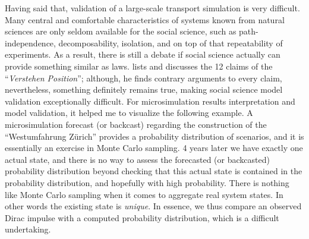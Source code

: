 Having said that, validation of a large-scale transport simulation is very difficult. Many central and comfortable characteristics of systems known from natural sciences are only seldom available for the social science, such as path-independence, decomposability, isolation, and on top of that repeatability of experiments. As a result, there is still a debate if social science actually can provide something similar as laws. \citet[][p.107ff]{Abel_1976} lists and discusses the 12 claims of the ``\emph{Verstehen Position}''; although, he finds contrary arguments to every claim, nevertheless, something definitely remains true, making social science model validation exceptionally difficult. For microsimulation results interpretation and model validation, it helped me to visualize the following example. A microsimulation forecast (or backcast) regarding the construction of the ``Westumfahrung Zürich'' provides a probability distribution of scenarios, and it is essentially an exercise in Monte Carlo sampling. 4 years later we have exactly one actual state, and there is no way to assess the forecasted (or backcasted) probability distribution beyond checking that this actual state is contained in the probability distribution, and hopefully with high probability. There is nothing like Monte Carlo sampling when it comes to aggregate real system states. In other words the existing state is \emph{unique}. In essence, we thus compare an observed Dirac impulse with a computed probability distribution, which is a difficult undertaking.

